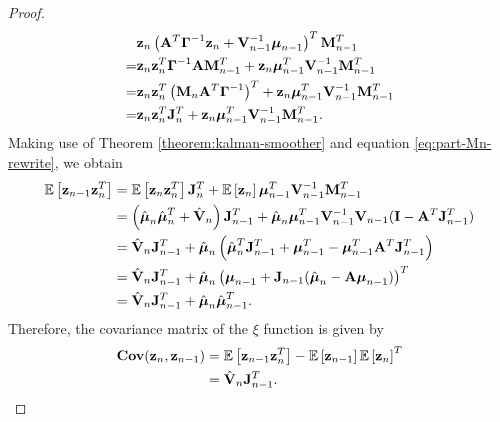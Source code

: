 \documentclass[12pt, oneside]{book}
\numberwithin{equation}{section}
\newcommand{\expectation}[1]{\mathbb{E}\left[#1\right]}
\newcommand{\z}{{\bf z}}
\begin{document}
{\begin{proof}
\begin{align}
		&\z_n \left({\bf A}^T\boldsymbol\Gamma^{-1}\z_{n} + {\bf V}_{n-1}^{-1}\boldsymbol\mu_{n-1}\right)^T {\bf M}_{n-1}^T \\
		=& \z_n \z_n^T \boldsymbol{\Gamma}^{-1}{\bf A} {\bf M}_{n-1}^T + \z_n \boldsymbol{\mu}_{n-1}^T {\bf V}_{n-1}^{-1}{\bf M}_{n-1}^T\\
		=& \z_n \z_n^T \left({\bf M}_n {\bf A}^T \boldsymbol\Gamma^{-1}\right)^T + \z_n \boldsymbol{\mu}_{n-1}^T {\bf V}_{n-1}^{-1}{\bf M}_{n-1}^T\\
		=& \z_n\z_n^T {\bf J}_n^T + \z_n \boldsymbol{\mu}_{n-1}^T {\bf V}_{n-1}^{-1}{\bf M}_{n-1}^T.
	\end{align}
	Making use of Theorem \ref{theorem:kalman-smoother} and equation \eqref{eq:part-Mn-rewrite}, we obtain
	\begin{align}
		\expectation{\z_{n-1}\z_n^T} &= \expectation{\z_n\z_n^T} {\bf J}_n^T + \expectation{\z_n}\boldsymbol{\mu}_{n-1}^T {\bf V}_{n-1}^{-1}{\bf M}_{n-1}^T\\
		&= \left(\hat{\boldsymbol{\mu}}_n\hat{\boldsymbol{\mu}}_n^T + \hat{\bf V}_n \right){\bf J}_{n-1}^T + \hat{\boldsymbol{\mu}}_n \boldsymbol{\mu}_{n-1}^T {\bf V}_{n-1}^{-1} {\bf V}_{n-1}({\bf I} - {\bf A}^T{\bf J}_{n-1}^T)\\
		&= \hat{\bf V}_n {\bf J}_{n-1}^T + \hat{\boldsymbol{\mu}}_n\left(\hat{\boldsymbol{\mu}}_n^T{\bf J}_{n-1}^T + \boldsymbol{\mu}_{n-1}^T - \boldsymbol{\mu}_{n-1}^T{\bf A}^T{\bf J}_{n-1}^T \right)\\
		&= \hat{\bf V}_n {\bf J}_{n-1}^T + \hat{\boldsymbol{\mu}}_n\left( \boldsymbol{\mu}_{n-1} + {\bf J}_{n-1} (\hat{\boldsymbol{\mu}}_n - {\bf A}\boldsymbol{\mu}_{n-1})\right)^T\\
		&= \hat{\bf V}_n {\bf J}_{n-1}^T + \hat{\boldsymbol{\mu}}_n \hat{\boldsymbol{\mu}}_{n-1}^T.
	\end{align}
	Therefore, the covariance matrix of the $\xi$ function is given by
	\begin{align}
		{\bf Cov}(\z_n, \z_{n-1}) &= \expectation{\z_{n-1}\z_{n}^T} - \expectation{\z_{n-1}}\expectation{\z_{n}}^T\\
		&= \hat{\bf V}_n {\bf J}_{n-1}^T.
	\end{align}
\end{proof}


}
\end{document}
